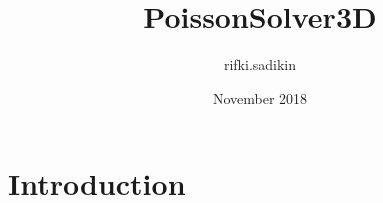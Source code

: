 \documentclass{article}
\title{PoissonSolver3D}
\author{rifki.sadikin }
\date{November 2018}
\begin{document}
\maketitle

\section{Introduction}
\end{document}
